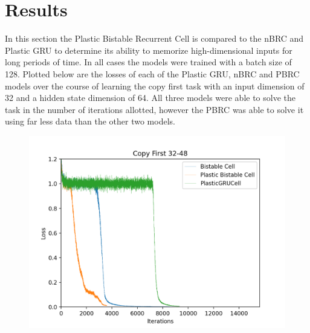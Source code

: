 \section{Results}

In this section the Plastic Bistable Recurrent Cell is compared to the nBRC and Plastic GRU to determine its ability to memorize high-dimensional inputs for long periods of time. In all cases the models were trained with a batch size of 128.
Plotted below are the losses of each of the Plastic GRU, nBRC and PBRC models over the course of learning the copy first task with an input dimension of 32 and a hidden state dimension of 64. All three models were able to solve the task in the number of iterations allotted, however the PBRC was able to solve it using far less data than the other two models.

\begin{figure}[h]
	\centering
	\includegraphics[width=5in]{plots/32_64_plot}
\end{figure}


